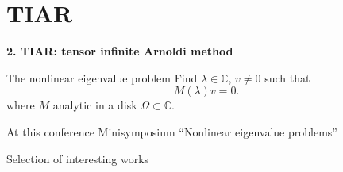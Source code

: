 \documentclass[10pt]{beamer}
\newcommand{\CC}{\mathbb{C}}
\newcommand{\mycite}[1]{$[$#1$]$}
\begin{document}
\section{TIAR}
\begin{frame}
\begin{center}
\Large
\bf 2. TIAR: tensor infinite Arnoldi method
 \vspace{0.5cm}
\end{center}
\end{frame}
\begin{frame}
\begin{block}{The nonlinear eigenvalue problem}
Find $\lambda\in\CC$, $v\neq 0$ such that
\begin{equation}
  M(\lambda)v=0.\label{eq:nlevp}
\end{equation}
where $M$ analytic in a disk $\Omega\subset\CC$. \\
\end{block}
\begin{block}{At this conference}
Minisymposium ``Nonlinear eigenvalue problems''
\end{block}
\pause
\begin{block}{Selection of interesting works}

\end{block}
\end{frame}
\end{document}
